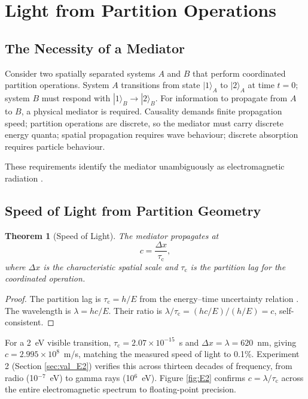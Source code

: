 \documentclass[twocolumn,10pt,a4paper]{article}
\newtheorem{theorem}{Theorem}[section]
\theoremstyle{definition}
\theoremstyle{remark}
\newcommand{\tauC}{\tau_{\mathrm{c}}}
\begin{document}
\section{Light from Partition Operations}
\label{sec:light}

\subsection{The Necessity of a Mediator}

Consider two spatially separated systems $A$ and $B$ that perform coordinated partition operations. System $A$ transitions from state $|1\rangle_A$ to $|2\rangle_A$ at time $t = 0$; system $B$ must respond with $|1\rangle_B \to |2\rangle_B$. For information to propagate from $A$ to $B$, a physical mediator is required. Causality demands finite propagation speed; partition operations are discrete, so the mediator must carry discrete energy quanta; spatial propagation requires wave behaviour; discrete absorption requires particle behaviour.

These requirements identify the mediator unambiguously as electromagnetic radiation \citep{einstein1905photo,planck1901}.

\subsection{Speed of Light from Partition Geometry}

\begin{theorem}[Speed of Light]
\label{thm:c}
The mediator propagates at
\begin{equation}
c = \frac{\Delta x}{\tauC},
\label{eq:c}
\end{equation}
where $\Delta x$ is the characteristic spatial scale and $\tauC$ is the partition lag for the coordinated operation.
\end{theorem}

\begin{proof}
The partition lag is $\tauC = h/E$ from the energy--time uncertainty relation \citep{mandelstam1945}. The wavelength is $\lambda = hc/E$. Their ratio is $\lambda/\tauC = (hc/E)/(h/E) = c$, self-consistent.
\end{proof}

For a 2~eV visible transition, $\tauC = 2.07\times10^{-15}$~s and $\Delta x = \lambda = 620$~nm, giving $c = 2.995\times10^8$~m/s, matching the measured speed of light to 0.1\%. Experiment 2 (Section \ref{sec:val_E2}) verifies this across thirteen decades of frequency, from radio (10$^{-7}$~eV) to gamma rays (10$^{6}$~eV). Figure \ref{fig:E2} confirms $c = \lambda/\tauC$ across the entire electromagnetic spectrum to floating-point precision.
\end{document}
